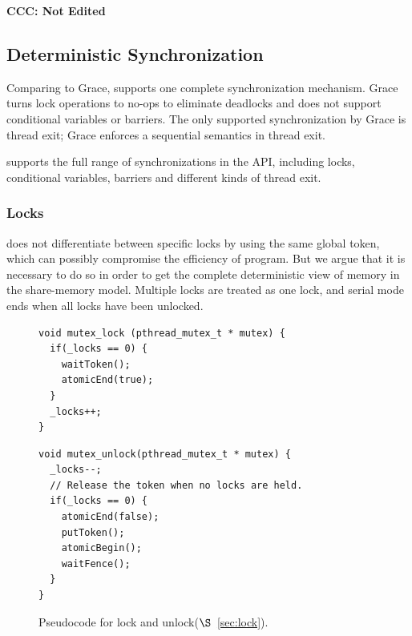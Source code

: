\textbf{CCC: Not Edited}

\subsection{Deterministic Synchronization}
\label{sec:synchronization}

Comparing to Grace, \dthreads{} supports one complete synchronization
mechanism.  Grace turns lock operations to no-ops to eliminate
deadlocks and does not support conditional variables or barriers.  The
only supported synchronization by Grace is thread exit; Grace enforces
a sequential semantics in thread exit.

\dthreads{} supports the full range of synchronizations in the
\pthreads{} API, including locks, conditional variables, barriers and
different kinds of thread exit.

\subsubsection{Locks}

\dthreads{} does not differentiate between specific locks by using the same global token, 
which can possibly compromise the efficiency of program. But we argue
that it is necessary to do so in order to get the complete
deterministic view of memory in the share-memory model.
Multiple locks are treated as one lock, and serial mode ends
when all locks have been unlocked. 




\begin{figure}
\begin{lstlisting}
void mutex_lock (pthread_mutex_t * mutex) {
  if(_locks == 0) {
    waitToken();
    atomicEnd(true);
  }
  _locks++;
}
\end{lstlisting}
\begin{lstlisting}
void mutex_unlock(pthread_mutex_t * mutex) {
  _locks--;
  // Release the token when no locks are held.
  if(_locks == 0) {
    atomicEnd(false);
    putToken();
    atomicBegin();
    waitFence();
  }
}
\end{lstlisting}
\caption{Pseudocode for lock and unlock($\S$~\ref{sec:lock}).
\label{fig:lock}}
\end{figure}

